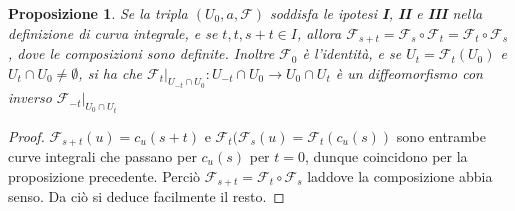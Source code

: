 \documentclass{article}
\newcommand{\composto}{\circ}
\newcommand{\intersez}{\cap}
\newcommand{\ci}[1]{\mathscr{#1}}%
\newcommand{\vuoto}{\emptyset}
\newtheorem{proposizione}{ Proposizione}
\begin{document}
 \begin{proposizione}
  Se la tripla $(U_0,a,\ci{F})$ soddisfa le ipotesi {\bf I}, {\bf II} e {\bf III} nella
  definizione di curva integrale, e se $t,t,s+t\in I$, allora $\ci{F}_{s+t}=
  \ci{F}_s\composto \ci{F}_t=\ci{F}_t\composto\ci{F}_s$, dove le composizioni sono definite.
  Inoltre $\ci{F}_0$ è l'identità, e se $U_t=\ci{F}_t(U_0)$ e $U_t\intersez U_0\ne\vuoto$, si ha
  che $\ci{F}_t|_{U_{-t}\intersez U_0}:U_{-t}\intersez U_0\to U_0\intersez U_t$ è un
  diffeomorfismo con inverso $\ci{F}_{-t}|_{U_0\intersez U_t}$
 \end{proposizione}

 \begin{proof}
  $\ci{F}_{s+t}(u)=c_u(s+t)$ e $\ci{F}_t(\ci{F}_s(u)=\ci{F}_t(c_u(s))$ sono entrambe
  curve integrali che passano per $c_u(s)$ per $t=0$, dunque coincidono per la proposizione
  precedente. Perciò $\ci{F}_{s+t}=\ci{F}_t\composto\ci{F}_s$ laddove la composizione
  abbia senso. Da ciò si deduce facilmente il resto.
 \end{proof}
\end{document}
